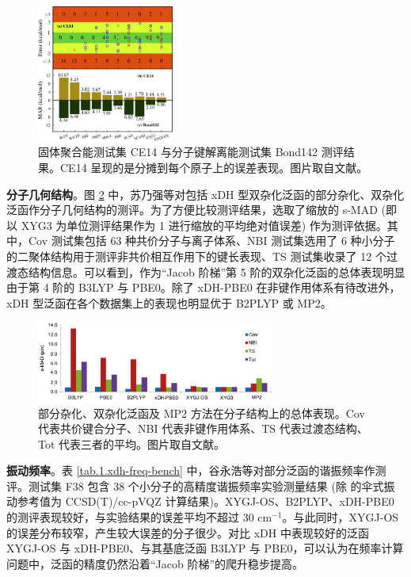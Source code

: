\begin{figure}[h]
  \centering
  \includegraphics[width=0.4\textwidth]{assets/xdh-solid.jpeg}
  \caption[泛函近似对固体聚合能与分子键解离能问题的测评]{固体聚合能测试集 CE14 与分子键解离能测试集 Bond142 测评结果。CE14 呈现的是分摊到每个原子上的误差表现。图片取自文献\cite{Wang-Xu.JA.2021}。}
  \label{fig.1.xdh-solid}
\end{figure}

\textbf{分子几何结构}。图 \ref{fig.1.xdh-pbe0-bond} 中，苏乃强等对包括 xDH 型双杂化泛函的部分杂化、双杂化泛函作分子几何结构的测评\cite{Su-Xu.SCC.2013}。为了方便比较测评结果，选取了缩放的 s-MAD (即以 XYG3 为单位测评结果作为 1 进行缩放的平均绝对值误差) 作为测评依据。其中，Cov 测试集包括 63 种共价分子与离子体系、NBI 测试集选用了 6 种小分子的二聚体结构用于测评非共价相互作用下的键长表现、TS 测试集收录了 12 个过渡态结构信息。可以看到，作为“Jacob 阶梯”第 5 阶的双杂化泛函的总体表现明显由于第 4 阶的 B3LYP 与 PBE0。除了 xDH-PBE0 在非键作用体系有待改进外，xDH 型泛函在各个数据集上的表现也明显优于 B2PLYP 或 MP2。

\begin{figure}[h]
  \centering
  \includegraphics[width=0.7\textwidth]{assets/xdh-pbe0-bond.jpg}
  \caption[泛函近似对分子构型问题的测评]{部分杂化、双杂化泛函及 MP2 方法在分子结构上的总体表现。Cov 代表共价键合分子、NBI 代表非键作用体系、TS 代表过渡态结构、Tot 代表三者的平均。图片取自文献\cite{Su-Xu.SCC.2013}。}
  \label{fig.1.xdh-pbe0-bond}
\end{figure}

\textbf{振动频率}。表 \ref{tab.1.xdh-freq-bench} 中，谷永浩等对部分泛函的谐振频率作测评\cite{Gu-Xu.JCTC.2021}。测试集 F38 包含 38 个小分子的高精度谐振频率实验测量结果 (除  的伞式振动参考值为 CCSD(T)/cc-pVQZ 计算结果)。XYGJ-OS、B2PLYP、xDH-PBE0 的测评表现较好，与实验结果的误差平均不超过 30 $\text{cm}^{-1}$。与此同时，XYGJ-OS 的误差分布较窄，产生较大误差的分子很少。对比 xDH 中表现较好的泛函 XYGJ-OS 与 xDH-PBE0、与其基底泛函 B3LYP 与 PBE0，可以认为在频率计算问题中，泛函的精度仍然沿着“Jacob 阶梯”的爬升稳步提高。

